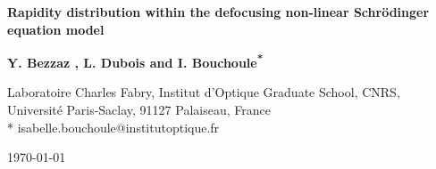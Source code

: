 \documentclass[submission,Phys,10pt]{SciPost}%
\begin{document}
\begin{center}{\Large \textbf{
      Rapidity distribution within the defocusing non-linear Schr\"odinger equation model
}}\end{center}

\begin{center}
{\bf Y. Bezzaz ,
L. Dubois %
and I. Bouchoule\textsuperscript{*}}
  
\end{center}

\begin{center}
  Laboratoire Charles Fabry, Institut d’Optique Graduate School, CNRS, Université Paris-Saclay, 91127 Palaiseau, France \\
  * isabelle.bouchoule@institutoptique.fr
\end{center}


\begin{center}
\today
\end{center}

\author{Les auteurs } %


\begin{abstract}
We consider the classical field integrable system whose 
evolution equation is the nonlinear Schr\"odinger equation with defocusing non-linearities, which is the
classical limit of the quantum Lieb-Liniger model.
 We propose a simple 
derivation of the relation between 
two sets of conserved quantities: on the one hand the trace of the monodromy matrix, parameterized by the spectral parameter
 and introduced in the inverse-scattering framework,
 and on the other hand the rapidity distribution, a concept 
imported from the Lieb-Liniger model. To do so we use the definition of the rapidity distribution
as 
the asymptotic momentum distribution after a very large expansion. 
We propose two different ways to derive the result, each one using a thought experiment 
that implements an expansion.
\end{abstract}
\end{document}
